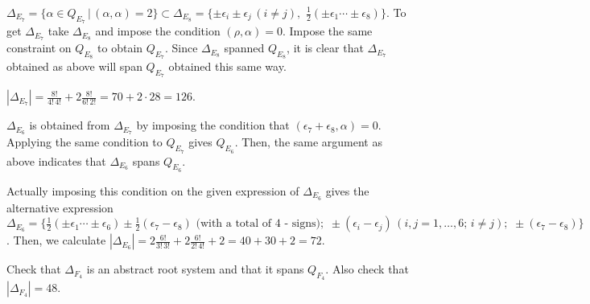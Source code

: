 \documentclass[11pt]{article}
\newenvironment{exercise}[1][Exercise]{\begin{trivlist}
\item[\hskip \labelsep {\bfseries #1}]}{\end{trivlist}}
\newenvironment{solution}[1][Solution]{\begin{trivlist}
\item[\hskip \labelsep {\bfseries #1}]}{\end{trivlist}}
\begin{document}
\begin{solution}
$\Delta_{E_7} = \{\alpha \in Q_{E_7} \, | \, (\alpha,\alpha)=2 \}
\subset \Delta_{E_8} = \{ \pm \epsilon_i \pm \epsilon_j \, (i \not
= j), \,\, \frac{1}{2} (\pm \epsilon_1 \cdots \pm \epsilon_8) \}$.
To get $\Delta_{E_7}$ take $\Delta_{E_8}$ and impose the condition
$(\rho,\alpha)=0$.  Impose the same constraint on $Q_{E_8}$ to
obtain $Q_{E_7}$.  Since $\Delta_{E_8}$ spanned $Q_{E_8}$, it is
clear that $\Delta_{E_7}$ obtained as above will span $Q_{E_7}$
obtained this same way.

$\left| \Delta_{E_7} \right| = \frac{8!}{4! \, 4!}+2 \frac{8!}{6!
\, 2!} = 70 + 2\cdot 28 = 126$.

$\Delta_{E_6}$ is obtained from $\Delta_{E_7}$ by imposing the
condition that $(\epsilon_7 + \epsilon_8, \alpha) = 0$.  Applying
the same condition to $Q_{E_7}$ gives $Q_{E_6}$.  Then, the same
argument as above indicates that $\Delta_{E_6}$ spans $Q_{E_6}$.

Actually imposing this condition on the given expression of
$\Delta_{E_6}$ gives the alternative expression $\Delta_{E_6} = \{
\frac{1}{2}(\pm \epsilon_1 \cdots \pm \epsilon_6) \pm
\frac{1}{2}(\epsilon_7 - \epsilon_8) \mbox{ (with a total of 4 -
signs)}; \,\, \pm (\epsilon_i - \epsilon_j) \, (i,j=1,\ldots,6; \,
i \not =j); \,\, \pm (\epsilon_7 - \epsilon_8) \}$.  Then, we
calculate $\left| \Delta_{E_6} \right| = 2 \frac{6!}{3! \, 3!} + 2
\frac{6!}{2! \, 4!} + 2 = 40 + 30 + 2 = 72$.
\end{solution}
%
%
\begin{exercise}
Check that $\Delta_{F_4}$ is an abstract root system and that it
spans $Q_{F_4}$.  Also check that $\left| \Delta_{F_4} \right| =
48$.
\end{exercise}
%
\end{document}
